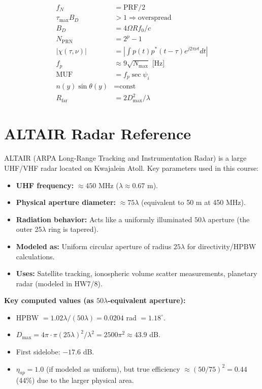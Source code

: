 \documentclass[10pt,letterpaper]{article}
\newcommand{\degrees}{^{\circ}}
\begin{document}
\begin{tcolorbox}[formulabox, title={Master Formula Sheet}]
\begin{align*}
  f_{N} &= \mathrm{PRF}/2 \\
  \tau_\mathrm{max}B_D &> 1 \Rightarrow\text{overspread} \\
  B_D &= 4\Omega R f_0/c \\
  N_\mathrm{PRN} &= 2^p-1 \\
  |\chi(\tau,\nu)| &= \left|\int p(t)p^*(t-\tau)e^{j2\pi\nu t}dt\right| \\
  f_p &\approx9\sqrt{N_\mathrm{max}}\text{ [Hz]} \\
  \mathrm{MUF} &= f_p\sec\psi_i \\
  n(y)\sin\theta(y) &= \text{const} \\
  R_\mathrm{far} &= 2D_\mathrm{max}^2/\lambda
\end{align*}
\end{tcolorbox}

\newpage
\section*{ALTAIR Radar Reference}

\begin{tcolorbox}[keybox, title={What is ALTAIR?}]
ALTAIR (ARPA Long-Range Tracking and Instrumentation Radar) is a large UHF/VHF radar located on Kwajalein Atoll. Key parameters used in this course:
\begin{itemize}[noitemsep]
  \item \textbf{UHF frequency:} $\approx 450$ MHz ($\lambda \approx 0.67$ m).
  \item \textbf{Physical aperture diameter:} $\approx 75\lambda$ (equivalent to 50 m at 450 MHz).
  \item \textbf{Radiation behavior:} Acts like a uniformly illuminated $50\lambda$ aperture (the outer 25$\lambda$ ring is tapered).
  \item \textbf{Modeled as:} Uniform circular aperture of radius $25\lambda$ for directivity/HPBW calculations.
  \item \textbf{Uses:} Satellite tracking, ionospheric volume scatter measurements, planetary radar (modeled in HW7/8).
\end{itemize}
\textbf{Key computed values (as $50\lambda$-equivalent aperture):}
\begin{itemize}[noitemsep]
  \item HPBW $= 1.02\lambda/(50\lambda) = 0.0204$ rad $= 1.18\degrees$.
  \item $D_\mathrm{max} = 4\pi\cdot\pi(25\lambda)^2/\lambda^2 = 2500\pi^2 \approx 43.9$ dB.
  \item First sidelobe: $-17.6$ dB.
  \item $\eta_{ap} = 1.0$ (if modeled as uniform), but true efficiency $\approx(50/75)^2 = 0.44$ (44\%) due to the larger physical area.
\end{itemize}
\end{tcolorbox}
\end{document}
